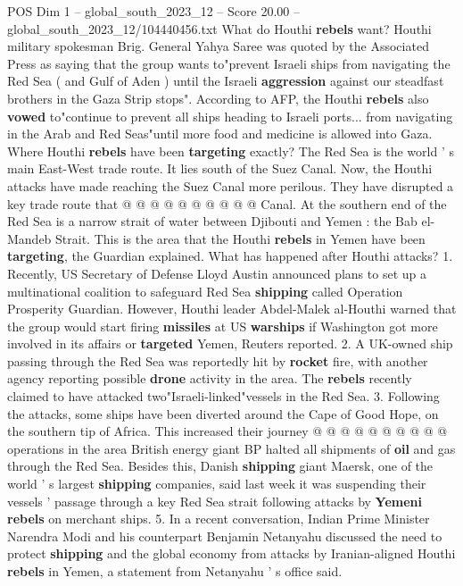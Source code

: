 \begin{textsample}{POS Dim 1 – global\_south\_2023\_12 – Score 20.00 – global\_south\_2023\_12/104440456.txt}
What do Houthi \textbf{rebels} want?
Houthi military spokesman Brig.
General Yahya Saree was quoted by the Associated Press as saying that the group wants to"prevent Israeli ships from navigating the Red Sea ( and Gulf of Aden ) until the Israeli \textbf{aggression} against our steadfast brothers in the Gaza Strip stops".
According to AFP, the Houthi \textbf{rebels} also \textbf{vowed} to"continue to prevent all ships heading to Israeli ports... from navigating in the Arab and Red Seas"until more food and medicine is allowed into Gaza.
Where Houthi \textbf{rebels} have been \textbf{targeting} exactly?
The Red Sea is the world ' s main East-West trade route.
It lies south of the Suez Canal.
Now, the Houthi attacks have made reaching the Suez Canal more perilous.
They have disrupted a key trade route that @ @ @ @ @ @ @ @ @ @ Canal.
At the southern end of the Red Sea is a narrow strait of water between Djibouti and Yemen : the Bab el-Mandeb Strait.
This is the area that the Houthi \textbf{rebels} in Yemen have been \textbf{targeting}, the Guardian explained.
What has happened after Houthi attacks? 1.
Recently, US Secretary of Defense Lloyd Austin announced plans to set up a multinational coalition to safeguard Red Sea \textbf{shipping} called Operation Prosperity Guardian.
However, Houthi leader Abdel-Malek al-Houthi warned that the group would start firing \textbf{missiles} at US \textbf{warships} if Washington got more involved in its affairs or \textbf{targeted} Yemen, Reuters reported. 2.
A UK-owned ship passing through the Red Sea was reportedly hit by \textbf{rocket} fire, with another agency reporting possible \textbf{drone} activity in the area.
The \textbf{rebels} recently claimed to have attacked two"Israeli-linked"vessels in the Red Sea. 3.
Following the attacks, some ships have been diverted around the Cape of Good Hope, on the southern tip of Africa.
This increased their journey @ @ @ @ @ @ @ @ @ @ operations in the area British energy giant BP halted all shipments of \textbf{oil} and gas through the Red Sea.
Besides this, Danish \textbf{shipping} giant Maersk, one of the world ' s largest \textbf{shipping} companies, said last week it was suspending their vessels ' passage through a key Red Sea strait following attacks by \textbf{Yemeni} \textbf{rebels} on merchant ships. 5.
In a recent conversation, Indian Prime Minister Narendra Modi and his counterpart Benjamin Netanyahu discussed the need to protect \textbf{shipping} and the global economy from attacks by Iranian-aligned Houthi \textbf{rebels} in Yemen, a statement from Netanyahu ' s office said.

\end{textsample}
